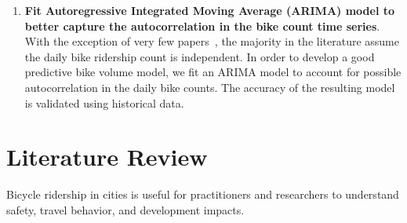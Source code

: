 \documentclass [11pt, proquest] {uwthesis}[2015/03/03]
\begin{document}
\begin{enumerate}
\item \textbf{Fit Autoregressive Integrated Moving Average (ARIMA) model to better capture the autocorrelation in the bike count time series}. With the exception of very few papers~\cite{Gallop:2012aa,Nosal:2014aa}, the majority in the literature assume the daily bike ridership count is independent. In order to develop a good predictive bike volume model, we fit an ARIMA model to account for possible autocorrelation in the daily bike counts. The accuracy of the resulting model is validated using historical data.
\end{enumerate}
 
 
 
\chapter{Literature Review}

Bicycle ridership in cities is useful for practitioners and researchers to understand safety, travel behavior, and development impacts. 
\end{document}
